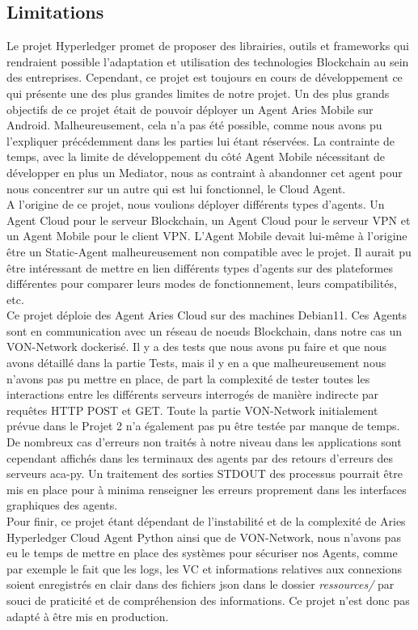 \documentclass[12pt, openany]{report}
\begin{document}
\subsection{Limitations}
\noindent 
\begin{flushleft}
Le projet Hyperledger promet de proposer des librairies, outils et frameworks qui rendraient possible l'adaptation et utilisation des technologies Blockchain au sein des entreprises. Cependant, ce projet est toujours en cours de développement ce qui présente une des plus grandes limites de notre projet. Un des plus grands objectifs de ce projet était de pouvoir déployer un Agent Aries Mobile sur Android. Malheureusement, cela n'a pas été possible, comme nous avons pu l'expliquer précédemment dans les parties lui étant réservées. La contrainte de temps, avec la limite de développement du côté Agent Mobile nécessitant de développer en plus un Mediator, nous as contraint à abandonner cet agent pour nous concentrer sur un autre qui est lui fonctionnel, le Cloud Agent.\\
A l'origine de ce projet, nous voulions déployer différents types d'agents. Un Agent Cloud pour le serveur Blockchain, un Agent Cloud pour le serveur VPN et un Agent Mobile pour le client VPN. L'Agent Mobile devait lui-même à l'origine être un Static-Agent malheureusement non compatible avec le projet. Il aurait pu être intéressant de mettre en lien différents types d'agents sur des plateformes différentes pour comparer leurs modes de fonctionnement, leurs compatibilités, etc.\\
Ce projet déploie des Agent Aries Cloud sur des machines Debian11. Ces Agents sont en communication avec un réseau de noeuds Blockchain, dans notre cas un VON-Network dockerisé. Il y a des tests que nous avons pu faire et que nous avons détaillé dans la partie Tests, mais il y en a que malheureusement nous n'avons pas pu mettre en place, de part la complexité de tester toutes les interactions entre les différents serveurs interrogés de manière indirecte par requêtes HTTP POST et GET. Toute la partie VON-Network initialement prévue dans le Projet 2 n'a également pas pu être testée par manque de temps. De nombreux cas d'erreurs non traités à notre niveau dans les applications sont cependant affichés dans les terminaux des agents par des retours d'erreurs des serveurs aca-py. Un traitement des sorties STDOUT des processus pourrait être mis en place pour à minima renseigner les erreurs proprement dans les interfaces graphiques des agents.\\
Pour finir, ce projet étant dépendant de l'instabilité et de la complexité de Aries Hyperledger Cloud Agent Python ainsi que de VON-Network, nous n'avons pas eu le temps de mettre en place des systèmes pour sécuriser nos Agents, comme par exemple le fait que les logs, les VC et informations relatives aux connexions soient enregistrés en clair dans des fichiers json dans le dossier \textit{ressources/} par souci de praticité et de compréhension des informations. Ce projet n'est donc pas adapté à être mis en production.
\end{flushleft}
\end{document}
